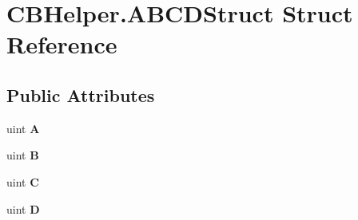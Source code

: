\section{C\-B\-Helper.\-A\-B\-C\-D\-Struct Struct Reference}
\label{struct_c_b_helper_1_1_a_b_c_d_struct}
\subsection*{Public Attributes}
\begin{DoxyCompactItemize}
\item 
uint {\bfseries A}\label{struct_c_b_helper_1_1_a_b_c_d_struct_ab7de6485772c2328c784be59cae7ddf9}

\item 
uint {\bfseries B}\label{struct_c_b_helper_1_1_a_b_c_d_struct_ae0be48a297f8e7012dea35f827e4270f}

\item 
uint {\bfseries C}\label{struct_c_b_helper_1_1_a_b_c_d_struct_a3bbcefa9a8fdaf911d690554460ef2bc}

\item 
uint {\bfseries D}\label{struct_c_b_helper_1_1_a_b_c_d_struct_ab2cbd31e5e786b7333f615e6b7218ada}

\end{DoxyCompactItemize}
